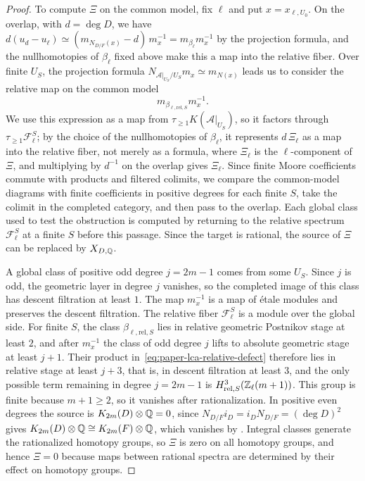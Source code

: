 \begin{proof}
To compute $\Xi$ on the common model, fix $\ell$ and put $x=x_{\ell,U_0}$.
On the overlap, with $d=\deg D$, we have $d(u_d-u_\ell)\simeq(m_{N_{D/F}(x)}-d)\,m_x^{-1}=m_{\beta_\ell}m_x^{-1}$ by the projection formula, and the nullhomotopies of $\beta_\ell$ fixed above make this a map into the relative fiber.
Over finite $U_S$, the projection formula $N_{\mathcal A|_{U_S}/U_S}m_x\simeq m_{N(x)}$ leads us to consider the relative map on the common model
\begin{equation}\label{eq:paper-lca-relative-defect}
 m_{\beta_{\ell,\mathrm{rel},S}}m_x^{-1}.
\end{equation}
We use this expression as a map from $\tau_{\ge1}K(\mathcal A|_{U_S})$, so it factors through $\tau_{\ge1}\mathcal F_\ell^S$; by the choice of the nullhomotopies of $\beta_\ell$, it represents $d\,\Xi_\ell$ as a map into the relative fiber, not merely as a formula, where $\Xi_\ell$ is the $\ell$-component of $\Xi$, and multiplying by $d^{-1}$ on the overlap gives $\Xi_\ell$.
Since finite Moore coefficients commute with products and filtered colimits, we compare the common-model diagrams with finite coefficients in positive degrees for each finite $S$, take the colimit in the completed category, and then pass to the overlap.
Each global class used to test the obstruction is computed by returning to the relative spectrum $\mathcal F_\ell^S$ at a finite $S$ before this passage.
Since the target is rational, the source of $\Xi$ can be replaced by $X_{D,\mathbb Q}$.

A global class of positive odd degree $j=2m-1$ comes from some $U_S$.
Since $j$ is odd, the geometric layer in degree $j$ vanishes, so the completed image of this class has descent filtration at least $1$.
The map $m_x^{-1}$ is a map of \'etale modules and preserves the descent filtration.
The relative fiber $\mathcal F_\ell^S$ is a module over the global side.
For finite $S$, the class $\beta_{\ell,\mathrm{rel},S}$ lies in relative geometric Postnikov stage at least $2$, and after $m_x^{-1}$ the class of odd degree $j$ lifts to absolute geometric stage at least $j+1$.
Their product in~\eqref{eq:paper-lca-relative-defect} therefore lies in relative stage at least $j+3$, that is, in descent filtration at least $3$, and the only possible term remaining in degree $j=2m-1$ is $H^3_{\mathrm{rel},S}(\mathbb Z_\ell(m+1))$.
This group is finite because $m+1\ge2$, so it vanishes after rationalization.
In positive even degrees the source is $K_{2m}(D)\otimes\mathbb Q=0$, since $N_{D/F}i_D=i_DN_{D/F}=(\deg D)^2$ gives $K_{2m}(D)\otimes\mathbb Q\cong K_{2m}(F)\otimes\mathbb Q$, which vanishes by \cite{Borel}.
Integral classes generate the rationalized homotopy groups, so $\Xi$ is zero on all homotopy groups, and hence $\Xi=0$ because maps between rational spectra are determined by their effect on homotopy groups.
\end{proof}

